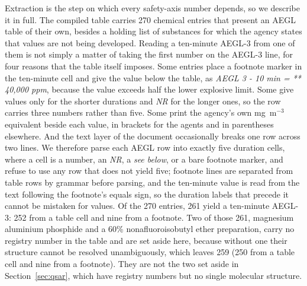 \documentclass[journal=jacsat,manuscript=suppinfo,margin=1in]{achemso}
\begin{document}
Extraction is the step on which every safety-axis number depends, so we describe
it in full. The compiled table carries 270 chemical entries that present an AEGL
table of their own, besides a holding list of substances for which the agency
states that values are not being developed. Reading a
ten-minute AEGL-3 from one of them is not simply a matter of taking the first
number on the AEGL-3 line, for four reasons that the table itself imposes. Some
entries place a footnote marker in the ten-minute cell and give the value below
the table, as \textit{AEGL 3 - 10 min = ** 40,000 ppm}, because the value exceeds
half the lower explosive limit. Some give values only for the shorter durations
and \textit{NR} for the longer ones, so the row carries three numbers rather than
five. Some print the agency's own mg~m$^{-3}$ equivalent beside each value, in
brackets for the agents and in parentheses elsewhere. And the text layer of the
document occasionally breaks one row across two lines. We therefore parse each
AEGL row into exactly five duration cells, where a cell is a number, an
\textit{NR}, a \textit{see below}, or a bare footnote marker, and refuse to use
any row that does not yield five; footnote lines are separated from table rows by
grammar before parsing, and the ten-minute value is read from the text following
the footnote's equals sign, so the duration labels that precede it cannot be
mistaken for values. Of the 270 entries, 261 yield a ten-minute AEGL-3: 252 from a table cell and
nine from a footnote. Two of those 261, magnesium aluminium phosphide and a 60\%
nonafluoroisobutyl ether preparation, carry no registry number in the table and
are set aside here, because without one their structure cannot be resolved
unambiguously, which leaves 259 (250 from a table cell and nine from a
footnote). They are not the two set aside in Section~\ref{sec:qsar}, which have
registry numbers but no single molecular structure.
\end{document}
